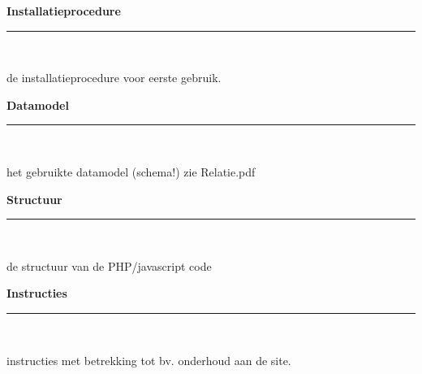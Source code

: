 \documentclass[a4paper,12pt]{article}
\newcommand{\HRule}{\rule{\linewidth}{0.5mm}}
\begin{document}
\newpage
\begin{center}
{\LARGE \bfseries Installatieprocedure}\\[0.1cm]
\HRule \\[0.5cm]
\end{center}
de installatieprocedure voor eerste gebruik.

\newpage
\begin{center}
{\LARGE \bfseries Datamodel}\\[0.1cm]
\HRule \\[0.5cm]
\end{center}
het gebruikte datamodel (schema!)
zie Relatie.pdf

\newpage
\begin{center}
{\LARGE \bfseries Structuur}\\[0.1cm]
\HRule \\[0.5cm]
\end{center}
de structuur van de PHP/javascript code

\newpage
\begin{center}
{\LARGE \bfseries Instructies}\\[0.1cm]
\HRule \\[0.5cm]
\end{center}
instructies met betrekking tot bv. onderhoud aan de site.
\end{document}
